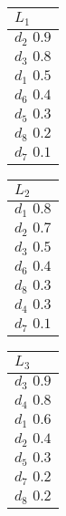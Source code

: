   \begin{table}[h]
    \begin{center}
      \begin{minipage}[t]{2cm}
        \begin{tabular}{|p{25pt}|}\hline
          $L_1$\\\hline
          $d_2 \, \, 0.9$\\\hline
          $d_3 \, \, 0.8$\\\hline
          $d_1 \, \, 0.5$\\\hline
          $d_6 \, \, 0.4$\\\hline
          $d_5 \, \, 0.3$\\\hline
          $d_8 \, \, 0.2$\\\hline
          $d_7 \, \, 0.1$\\\hline
        \end{tabular}
      \end{minipage}
      \hspace{5mm}
      \begin{minipage}[t]{2cm}
        \begin{tabular}{|p{25pt}|}\hline
          $L_2$\\\hline
          $d_1 \, \, 0.8$\\\hline
          $d_2 \, \, 0.7$\\\hline
          $d_3 \, \, 0.5$\\\hline
          $d_6 \, \, 0.4$\\\hline
          $d_8 \, \, 0.3$\\\hline
          $d_4 \, \, 0.3$\\\hline
          $d_7 \, \, 0.1$\\\hline
        \end{tabular}
      \end{minipage}
      \hspace{5mm}
      \begin{minipage}[t]{2cm}
        \begin{tabular}{|p{25pt}|}\hline
          $L_3$\\\hline
          $d_3 \, \, 0.9$\\\hline
          $d_4 \, \, 0.8$\\\hline
          $d_1 \, \, 0.6$\\\hline
          $d_2 \, \, 0.4$\\\hline
          $d_5 \, \, 0.3$\\\hline
          $d_7 \, \, 0.2$\\\hline
          $d_8 \, \, 0.2$\\\hline
        \end{tabular}
      \end{minipage}
    \end{center}
  \end{table}

